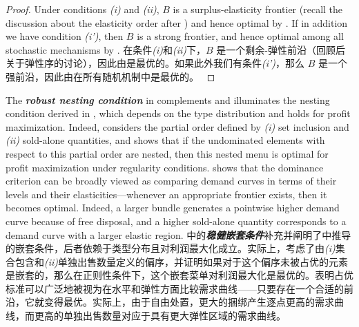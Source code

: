 \documentclass[12pt,letterpaper]{article}
\newenvironment{original}{\color{black}\noindent}{}
\newenvironment{translation}{\color{blue}\noindent}{}
\theoremstyle{plain}
\theoremstyle{definition}
\theoremstyle{remark}
\renewcommand{\1}{\mathds{1}}
\theoremstyle{definition}
\begin{document}
\begin{proof}
\begin{original}
Under conditions \textit{(i)} and \textit{(ii)}, $B$ is a surplus-elasticity frontier (recall the discussion about the elasticity order after ) and hence optimal by . If in addition we have condition \textit{(i')}, then $B$ is a strong frontier, and hence optimal among all stochastic mechanisms by .
\end{original}
\begin{translation}
在条件\textit{(i)}和\textit{(ii)}下，$B$ 是一个剩余-弹性前沿（回顾后关于弹性序的讨论），因此由是最优的。如果此外我们有条件\textit{(i')}，那么 $B$ 是一个强前沿，因此由在所有随机机制中是最优的。
\end{translation}
\end{proof}

\begin{original}
The \textit{\textbf{robust nesting condition}} in  complements and illuminates the nesting condition derived in \citet{yang2023nested}, which depends on the type distribution and holds for profit maximization. Indeed, \citet{yang2023nested} considers the partial order defined by \textit{(i)} set inclusion and \textit{(ii)} sold-alone quantities, and shows that if the undominated elements with respect to this partial order are nested, then this nested menu is optimal for profit maximization under regularity conditions.  shows that the dominance criterion can be broadly viewed as comparing demand curves in terms of their levels and their elasticities---whenever an appropriate frontier exists, then it becomes optimal. Indeed, a larger bundle generates a pointwise higher demand curve because of free disposal, and a higher sold-alone quantity corresponds to a demand curve with a larger elastic region.
\end{original}
\begin{translation}
中的\textit{\textbf{稳健嵌套条件}}补充并阐明了\citet{yang2023nested}中推导的嵌套条件，后者依赖于类型分布且对利润最大化成立。实际上，\citet{yang2023nested}考虑了由\textit{(i)}集合包含和\textit{(ii)}单独出售数量定义的偏序，并证明如果对于这个偏序未被占优的元素是嵌套的，那么在正则性条件下，这个嵌套菜单对利润最大化是最优的。表明占优标准可以广泛地被视为在水平和弹性方面比较需求曲线——只要存在一个合适的前沿，它就变得最优。实际上，由于自由处置，更大的捆绑产生逐点更高的需求曲线，而更高的单独出售数量对应于具有更大弹性区域的需求曲线。
\end{translation}
\end{document}
